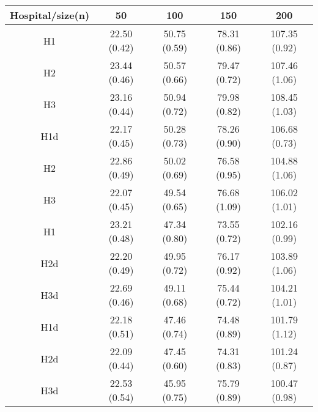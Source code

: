\begin{center}
\begin{tabular}{c | c | c | c | c}
Hospital/size(n) & 50 & 100 & 150 & 200\\ \hline
H1 & 22.50 (0.42) & 50.75 (0.59) & 78.31 (0.86) & 107.35 (0.92) \\
H2 & 23.44 (0.46) & 50.57 (0.66) & 79.47 (0.72) & 107.46 (1.06) \\
H3 & 23.16 (0.44) & 50.94 (0.72) & 79.98 (0.82) & 108.45 (1.03) \\
H1d & 22.17 (0.45) & 50.28 (0.73) & 78.26 (0.90) & 106.68 (0.73) \\
H2 & 22.86 (0.49) & 50.02 (0.69) & 76.58 (0.95) & 104.88 (1.06) \\
H3 & 22.07 (0.45) & 49.54 (0.65) & 76.68 (1.09) & 106.02 (1.01) \\
H1 & 23.21 (0.48) & 47.34 (0.80) & 73.55 (0.72) & 102.16 (0.99) \\
H2d & 22.20 (0.49) & 49.95 (0.72) & 76.17 (0.92) & 103.89 (1.06) \\
H3d & 22.69 (0.46) & 49.11 (0.68) & 75.44 (0.72) & 104.21 (1.01) \\
H1d & 22.18 (0.51) & 47.46 (0.74) & 74.48 (0.89) & 101.79 (1.12) \\
H2d & 22.09 (0.44) & 47.45 (0.60) & 74.31 (0.83) & 101.24 (0.87) \\
H3d & 22.53 (0.54) & 45.95 (0.75) & 75.79 (0.89) & 100.47 (0.98) \\
\end{tabular}
\end{center}
